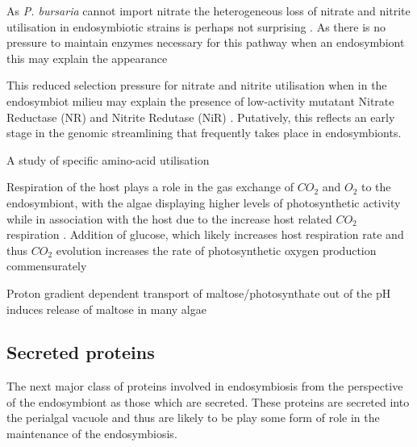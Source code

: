 As \textit{P. bursaria} cannot import nitrate \citep{Albers1982} the heterogeneous
loss of nitrate and nitrite utilisation in endosymbiotic strains is perhaps not surprising \citep{Kato2009}.
As there is no pressure to maintain enzymes necessary for this pathway when an endosymbiont
this may explain the appearance 

This reduced selection pressure for nitrate and nitrite utilisation when in the endosymbiot
milieu may explain the presence of low-activity mutatant Nitrate Reductase (NR) and Nitrite
Redutase (NiR) \citep{Kato2009}. 
Putatively, this reflects an early stage in the genomic streamlining that frequently
takes place in endosymbionts. 


A study of specific amino-acid utilisation 




 Respiration of the host plays a role in the gas exchange of \(CO_2\) and \(O_2\) 
 to the endosymbiont, with the algae displaying higher levels of photosynthetic
 activity while in association with the host due to the increase host related 
 \(CO_2\) respiration \citep{Reisser1980}.
Addition of glucose, which likely increases host respiration rate and thus \(CO_2\)
evolution increases the rate of photosynthetic oxygen production commensurately \citep{Reisser1980}




Proton gradient dependent transport of maltose/photosynthate out of the \citep{Schussler1992}
pH induces release of maltose in many algae \citep{}

%


\subsection{Secreted proteins}

The next major class of proteins involved in endosymbiosis
from the perspective of the endosymbiont as those
which are secreted.   These proteins are secreted
into the perialgal vacuole and thus are likely to
be play some form of role in the maintenance of
the endosymbiosis.


